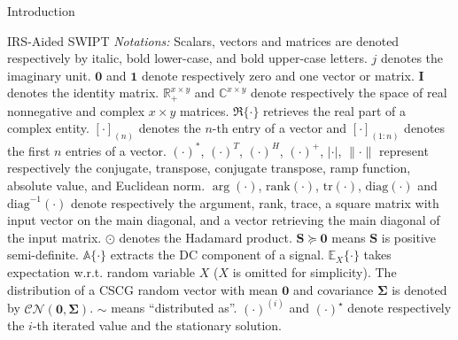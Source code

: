 \documentclass[journal,12pt,onecolumn,draftclsnofoot]{IEEEtran}
\begin{document}
\begin{section}{Introduction}
\begin{subsection}{IRS-Aided SWIPT}
			\emph{Notations:} Scalars, vectors and matrices are denoted respectively by italic, bold lower-case, and bold upper-case letters. $j$ denotes the imaginary unit. $\boldsymbol{0}$ and $\boldsymbol{1}$ denote respectively zero and one vector or matrix. $\boldsymbol{I}$ denotes the identity matrix. $\mathbb{R}_+^{x \times y}$ and $\mathbb{C}^{x \times y}$ denote respectively the space of real nonnegative and complex $x \times y$ matrices. $\Re\{\cdot\}$ retrieves the real part of a complex entity. $[\cdot]_{(n)}$ denotes the $n$-th entry of a vector and $[\cdot]_{(1:n)}$ denotes the first $n$ entries of a vector. $(\cdot)^*$, $(\cdot)^T$, $(\cdot)^H$, $(\cdot)^+$, $\lvert{\cdot}\rvert$, $\lVert{\cdot}\rVert$ represent respectively the conjugate, transpose, conjugate transpose, ramp function, absolute value, and Euclidean norm. $\arg(\cdot)$, $\mathrm{rank}(\cdot)$, $\mathrm{tr}(\cdot)$, $\mathrm{diag}(\cdot)$ and $\mathrm{diag}^{-1}(\cdot)$ denote respectively the argument, rank, trace, a square matrix with input vector on the main diagonal, and a vector retrieving the main diagonal of the input matrix. $\odot$ denotes the Hadamard product. $\boldsymbol{S} \succeq \boldsymbol{0}$ means $\boldsymbol{S}$ is positive semi-definite. $\mathbb{A}\{\cdot\}$ extracts the DC component of a signal. $\mathbb{E}_X\{\cdot\}$ takes expectation w.r.t. random variable $X$ ($X$ is omitted for simplicity). The distribution of a CSCG random vector with mean $\boldsymbol{0}$ and covariance $\boldsymbol{\Sigma}$ is denoted by $\mathcal{CN}(\boldsymbol{0},\boldsymbol{\Sigma})$. $\sim$ means ``distributed as''. $(\cdot)^{(i)}$ and $(\cdot)^{\star}$ denote respectively the $i$-th iterated value and the stationary solution.
		\end{subsection}
	\end{section}
\end{document}
